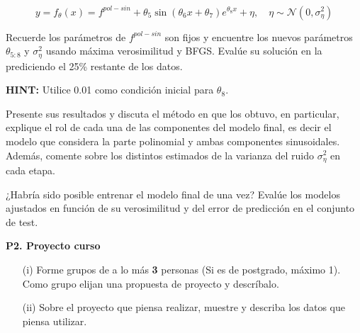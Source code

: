 \documentclass[11pt,letterpaper]{article}
\begin{document}
\begin{itemize}
		$$ y = f_\theta(x) = f^{pol-sin} + \theta_5\sin(\theta_6x + \theta_7)e^{\theta_8x}+\eta,\quad \eta \sim \mathcal{N}(0,\sigma_\eta^2)$$
		
	Recuerde los parámetros de $f^{pol-sin}$ son fijos y encuentre los nuevos parámetros $\theta_{5:8}$ y $\sigma_{\eta}^2$ usando máxima verosimilitud y BFGS. Evalúe su solución en la prediciendo el 25\% restante de los datos.
	
	\noindent \textbf{HINT:} Utilice 0.01 como condición inicial para $\theta_8$.
	
	Presente sus resultados y discuta el método en que los obtuvo, en particular, explique el rol de cada una de las componentes del modelo final, es decir el modelo que considera la parte polinomial y ambas componentes sinusoidales. Además, comente sobre los distintos estimados de la varianza del ruido $\sigma_{\eta}^2$ en cada etapa.
	
	¿Habría sido posible entrenar el modelo final de una vez? Evalúe los modelos ajustados en función de su verosimilitud y del error de predicción en el conjunto de test.
\end{itemize}


\vspace{5 mm}
\noindent\textbf{P2. Proyecto curso}
\vspace{5 mm}

\begin{itemize}
	\item[(i)] Forme grupos de a lo más \textbf{3} personas (Si es de postgrado, máximo 1). Como grupo elijan una propuesta de proyecto y descríbalo.
	\item[(ii)] Sobre el proyecto que piensa realizar, muestre y describa los datos que piensa utilizar.
\end{itemize}
\end{document}
